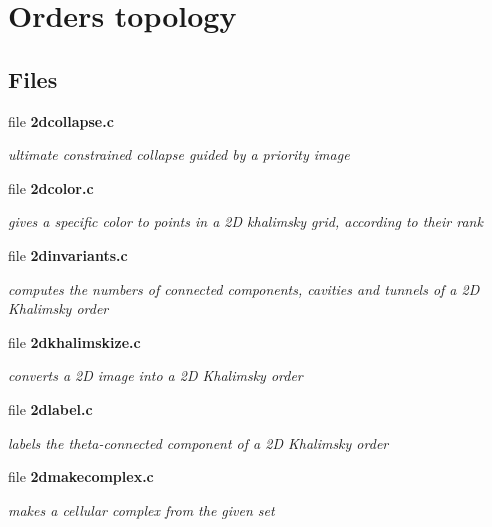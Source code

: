 \section{Orders topology}
\label{group__orders}
\subsection*{Files}
\begin{CompactItemize}
\item 
file \bf{2dcollapse.c}
\begin{CompactList}\small\item\em ultimate constrained collapse guided by a priority image \item\end{CompactList}

\item 
file \bf{2dcolor.c}
\begin{CompactList}\small\item\em gives a specific color to points in a 2D khalimsky grid, according to their rank \item\end{CompactList}

\item 
file \bf{2dinvariants.c}
\begin{CompactList}\small\item\em computes the numbers of connected components, cavities and tunnels of a 2D Khalimsky order \item\end{CompactList}

\item 
file \bf{2dkhalimskize.c}
\begin{CompactList}\small\item\em converts a 2D image into a 2D Khalimsky order \item\end{CompactList}

\item 
file \bf{2dlabel.c}
\begin{CompactList}\small\item\em labels the theta-connected component of a 2D Khalimsky order \item\end{CompactList}

\item 
file \bf{2dmakecomplex.c}
\begin{CompactList}\small\item\em makes a cellular complex from the given set \item\end{CompactList}


\end{CompactItemize}
